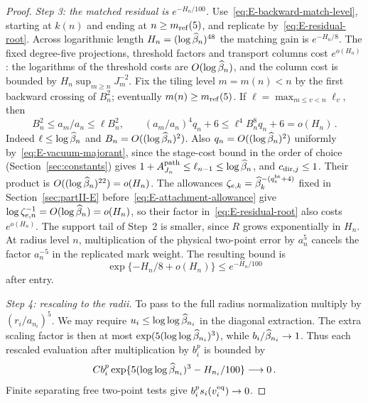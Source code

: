 \begin{proof}
\emph{Step 3: the matched residual is $e^{-H_n/100}$.} Use~\eqref{eq:E-backward-match-level}, starting at $k(n)$ and ending at $n\ge m_{\mathrm{ref}}(5)$, and replicate by~\eqref{eq:E-residual-root}. Across logarithmic length $H_n=(\log\widehat{\beta}_n)^{48}$ the matching gain is $e^{-H_n/8}$. The fixed degree-five projections, threshold factors and transport columns cost $e^{o(H_n)}$: the logarithms of the threshold costs are $O(\log\widehat{\beta}_n)$, and the column cost is bounded by $H_n\sup_{m\ge n}J_m^{-2}$. Fix the tiling level $m=m(n)<n$ by the first backward crossing of $B_n^2$; eventually $m(n)\ge m_{\mathrm{ref}}(5)$. If $\ell=\max_{m\le v<n}\ell_v$, then
\begin{equation*}
 B_n^2\le a_m/a_n\le\ell B_n^2,\qquad
 (a_m/a_n)^4q_n+6\le\ell^4B_n^8q_n+6=o(H_n)\,.
\end{equation*}
Indeed $\ell\le\log\widehat{\beta}_n$ and $B_n=O((\log\widehat{\beta}_n)^2)$. Also $q_n=O((\log\widehat{\beta}_n)^2)$ uniformly by~\eqref{eq:E-vacuum-majorant}, since the stage-cost bound in the order of choice (Section~\ref{sec:constants}) gives $1+A^{\rm path}_{J_n}\le\ell_{n-1}\le\log\widehat{\beta}_n$, and $c_{{\rm dir},j}\le1$. Their product is $O((\log\widehat{\beta}_n)^{22})=o(H_n)$. The allowances $\zeta_{e,k}=\widehat{\beta}_k^{-(q^{\rm ht}_e+4)}$ fixed in Section~\ref{sec:partII-E} before~\eqref{eq:E-attachment-allowance} give $\log\zeta_{e,n}^{-1}=O(\log\widehat{\beta}_n)=o(H_n)$, so their factor in~\eqref{eq:E-residual-root} also costs $e^{o(H_n)}$. The support tail of Step~2 is smaller, since $R$ grows exponentially in $H_n$. At radius level $n$, multiplication of the physical two-point error by $a_n^5$ cancels the factor $a_n^{-5}$ in the replicated mark weight. The resulting bound is
\begin{equation*}
 \exp\{-H_n/8+o(H_n)\}\le e^{-H_n/100}
\end{equation*}
after entry.

\emph{Step 4: rescaling to the radii.} To pass to the full radius normalization multiply by $(r_i/a_{n_i})^5$. We may require $u_i\le\log\log\widehat{\beta}_{n_i}$ in the diagonal extraction. The extra scaling factor is then at most $\exp(5(\log\log\widehat{\beta}_{n_i})^3)$, while $b_i/\widehat{\beta}_{n_i}\to1$. Thus each rescaled evaluation after multiplication by $b_i^p$ is bounded by
\begin{equation*}
 C b_i^p\exp\{5(\log\log\widehat{\beta}_{n_i})^3-H_{n_i}/100\}\longrightarrow0\,.
\end{equation*}
Finite separating free two-point tests give $b_i^ps_i(v_i^{\rm eq})\to0$.


\end{proof}
